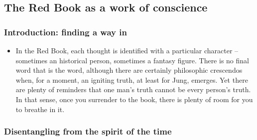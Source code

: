 \subsection{The Red Book as a work of conscience}

\subsubsection{Introduction: finding a way in}

\begin{itemize}

\item In the Red Book, each thought is identified with a particular character
-- sometimes an historical person, sometimes a fantasy figure. There is no
final word that is the word, although there are certainly philosophic
crescendos when, for a moment, an igniting truth, at least for Jung, emerges.
Yet there are plenty of reminders that one man's truth cannot be every person's
truth. In that sense, once you surrender to the book, there is plenty of room
for you to breathe in it.

\end{itemize}

\subsubsection{Disentangling from the spirit of the time}

